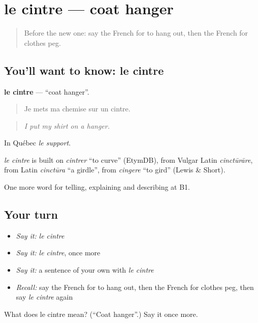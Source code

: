 \section[le cintre]{le cintre — coat hanger}

\label{lesson:FR-C526-cintre}



\begin{quote}
Before the new one: say the French for to hang out, then the French for clothes peg.
\end{quote}

\subsection*{You'll want to know: le cintre}
\textbf{le cintre} — \textquotedblleft{}coat hanger\textquotedblright{}.

\begin{quote}
Je mets ma chemise sur un cintre.
\end{quote}

\begin{quote}
\emph{I put my shirt on a hanger.}
\end{quote}

In Québec \emph{le support}.

\begin{cousinweb}
\emph{le cintre} is built on \emph{cintrer} \textquotedblleft{}to curve\textquotedblright{} (EtymDB), from Vulgar Latin \emph{cinctūrāre}, from Latin \emph{cinctūra} \textquotedblleft{}a girdle\textquotedblright{}, from \emph{cingere} \textquotedblleft{}to gird\textquotedblright{} (Lewis \& Short).
\end{cousinweb}

\begin{grammarlens}[title={What you've built}]
One more word for telling, explaining and describing at B1.
\end{grammarlens}

\subsection*{Your turn}
\begin{itemize}
\raggedright
  \item \emph{Say it:} \emph{le cintre}
  \item \emph{Say it:} \emph{le cintre}, once more
  \item \emph{Say it:} a sentence of your own with \emph{le cintre}
  \item \emph{Recall:} say the French for to hang out, then the French for clothes peg, then say \emph{le cintre} again
\end{itemize}

\begin{tcolorbox}[breakable,colback=teal!4,colframe=teal!35!black,title={Before you move on}]
What does le cintre mean? (\textquotedblleft{}Coat hanger\textquotedblright{}.) Say it once more.
\end{tcolorbox}
